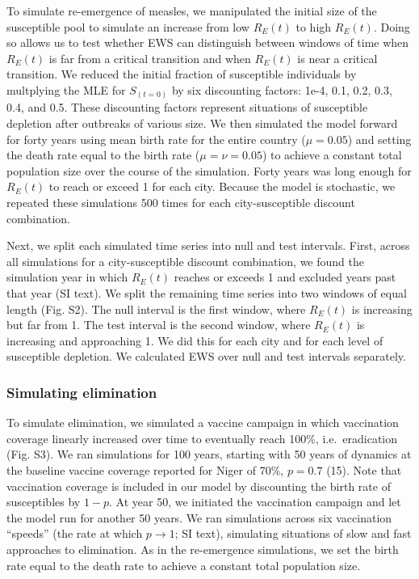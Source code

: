 \documentclass[3p]{elsarticle} %
\begin{document}
To simulate re-emergence of measles, we manipulated the initial size of
the susceptible pool to simulate an increase from low \(R_E(t)\) to high
\(R_E(t)\). Doing so allows us to test whether EWS can distinguish
between windows of time when \(R_E(t)\) is far from a critical
transition and when \(R_E(t)\) is near a critical transition. We reduced
the initial fraction of susceptible individuals by multplying the MLE
for \(S_{(t=0)}\) by six discounting factors: 1e-4, 0.1, 0.2, 0.3, 0.4,
and 0.5. These discounting factors represent situations of susceptible
depletion after outbreaks of various size. We then simulated the model
forward for forty years using mean birth rate for the entire country
(\(\mu = 0.05\)) and setting the death rate equal to the birth rate
(\(\mu = \nu = 0.05\)) to achieve a constant total population size over
the course of the simulation. Forty years was long enough for \(R_E(t)\)
to reach or exceed 1 for each city. Because the model is stochastic, we
repeated these simulations 500 times for each city-susceptible discount
combination.

Next, we split each simulated time series into null and test intervals.
First, across all simulations for a city-susceptible discount
combination, we found the simulation year in which \(R_E(t)\) reaches or
exceeds 1 and excluded years past that year (SI text). We split the
remaining time series into two windows of equal length (Fig. S2). The
null interval is the first window, where \(R_E(t)\) is increasing but
far from 1. The test interval is the second window, where \(R_E(t)\) is
increasing and approaching 1. We did this for each city and for each
level of susceptible depletion. We calculated EWS over null and test
intervals separately.

\hypertarget{simulating-elimination}{%
\subsubsection{Simulating elimination}\label{simulating-elimination}}

To simulate elimination, we simulated a vaccine campaign in which
vaccination coverage linearly increased over time to eventually reach
100\%, i.e.~eradication (Fig. S3). We ran simulations for 100 years,
starting with 50 years of dynamics at the baseline vaccine coverage
reported for Niger of 70\%, \(p = 0.7\) (15). Note that vaccination
coverage is included in our model by discounting the birth rate of
susceptibles by \(1-p\). At year 50, we initiated the vaccination
campaign and let the model run for another 50 years. We ran simulations
across six vaccination ``speeds'' (the rate at which
\(p \rightarrow 1\); SI text), simulating situations of slow and fast
approaches to elimination. As in the re-emergence simulations, we set
the birth rate equal to the death rate to achieve a constant total
population size.
\end{document}
